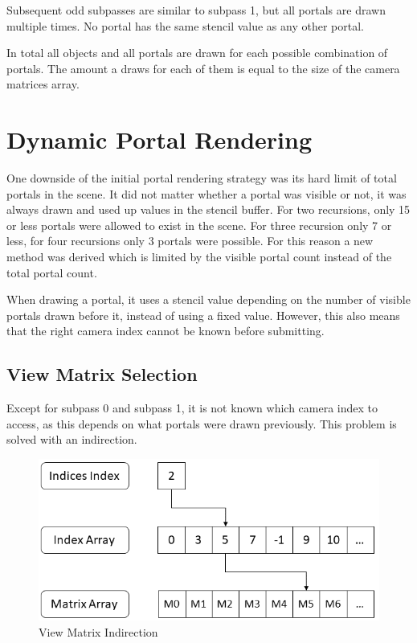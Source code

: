 Subsequent odd subpasses are similar to subpass 1, but all portals are drawn multiple times. No portal has the same stencil value as any other portal.

In total all objects and all portals are drawn for each possible combination of portals. The amount a draws for each of them is equal to the size of the camera matrices array.


\section{Dynamic Portal Rendering}
One downside of the initial portal rendering strategy was its hard limit of total portals in the scene. It did not matter whether a portal was visible or not, it was always drawn and used up values in the stencil buffer. For two recursions, only 15 or less portals were allowed to exist in the scene. For three recursion only 7 or less, for four recursions only 3 portals were possible. For this reason a new method was derived which is limited by the visible portal count instead of the total portal count. 

When drawing a portal, it uses a stencil value depending on the number of visible portals drawn before it, instead of using a fixed value. However, this also means that the right camera index cannot be known before submitting.


\subsection{View Matrix Selection}
\label{section:viewmatrixselection}
Except for subpass 0 and subpass 1, it is not known which camera index to access, as this depends on what portals were drawn previously. This problem is solved with an indirection.

\begin{figure}[h]
	\includegraphics[width=\linewidth]{images/viewmatrixindirection.png}
	\caption{View Matrix Indirection}
	\label{fig:viewmatrixindirection}
\end{figure}

